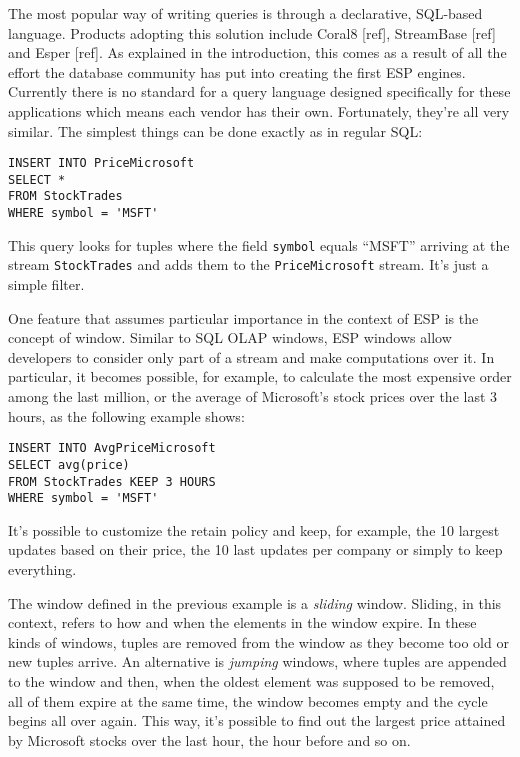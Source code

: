 \documentclass{report}
\begin{document}
The most popular way of writing queries is through a declarative, SQL-based language. Products adopting this solution include Coral8 [ref], StreamBase [ref] and Esper [ref]. As explained in the introduction, this comes as a result of all the effort the database community has put into creating the first ESP engines. Currently there is no standard for a query language designed specifically for these applications which means each vendor has their own. Fortunately, they're all very similar. The simplest things can be done exactly as in regular SQL:

\begin{verbatim}
INSERT INTO PriceMicrosoft
SELECT *
FROM StockTrades
WHERE symbol = 'MSFT'
\end{verbatim}

This query looks for tuples where the field \verb=symbol= equals ``MSFT'' arriving at the stream \verb=StockTrades= and adds them to the \verb=PriceMicrosoft= stream. It's just a simple filter.

One feature that assumes particular importance in the context of ESP is the concept of window. Similar to SQL OLAP windows, ESP windows allow developers to consider only part of a stream and make computations over it. In particular, it becomes possible, for example, to calculate the most expensive order among the last million, or the average of Microsoft's stock prices over the last 3 hours, as the following example shows:

\begin{verbatim}
INSERT INTO AvgPriceMicrosoft
SELECT avg(price)
FROM StockTrades KEEP 3 HOURS
WHERE symbol = 'MSFT'
\end{verbatim}

It's possible to customize the retain policy and keep, for example, the 10 largest updates based on their price, the 10 last updates per company or simply to keep everything.

The window defined in the previous example is a \emph{sliding} window. Sliding, in this context, refers to how and when the elements in the window expire. In these kinds of windows, tuples are removed from the window as they become too old or new tuples arrive. An alternative is \emph{jumping} windows, where tuples are appended to the window and then, when the oldest element was supposed to be removed, all of them expire at the same time, the window becomes empty and the cycle begins all over again. This way, it's possible to find out the largest price attained by Microsoft stocks over the last hour, the hour before and so on.
\end{document}

